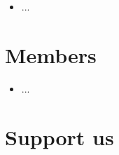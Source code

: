 \documentclass[
notumble,
nofoldmark,
]{leaflet}
\begin{document}
\begin{itemize}
\item ...
\end{itemize} 
 
\newpage  %
\section{Members}

\begin{itemize}
 \item ...
\end{itemize}

     
\newpage   %
\section{Support us}
 

\loggingall
\end{document}
